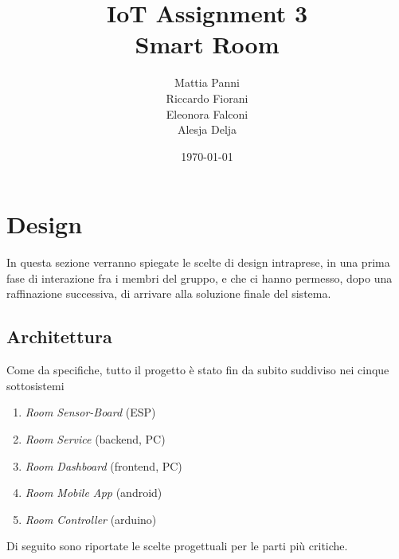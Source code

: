\documentclass[a4paper,12pt]{report}
\title{%
  IoT Assignment 3 \\
  \large Smart Room}
\author{Mattia Panni \\ Riccardo Fiorani \\ Eleonora Falconi \\ Alesja Delja}
\date{\today}
\begin{document}
\maketitle
\tableofcontents


\chapter{Design}
In questa sezione verranno spiegate le scelte di design intraprese, in una prima fase di interazione fra i membri del gruppo, e che ci hanno permesso, dopo una raffinazione successiva, di arrivare alla soluzione finale del sistema.
\section{Architettura}
Come da specifiche, tutto il progetto è stato fin da subito suddiviso nei cinque sottosistemi 
\begin{enumerate}
    \item \emph{Room Sensor-Board} (ESP)
    \item \emph{Room Service} (backend, PC)
    \item \emph{Room Dashboard} (frontend, PC)
    \item \emph{Room Mobile App} (android)
    \item \emph{Room Controller} (arduino)
\end{enumerate}

Di seguito sono riportate le scelte progettuali per le parti più critiche.
\end{document}
